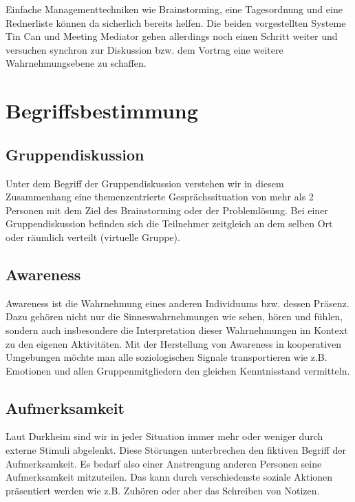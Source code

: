 \documentclass{seminarvorlage}
\begin{document}
Einfache Managementtechniken wie Brainstorming, eine Tagesordnung und eine
Rednerliste können da sicherlich bereits helfen.
Die beiden vorgestellten Systeme Tin Can und Meeting Mediator gehen allerdings
noch einen Schritt weiter und versuchen synchron zur Diskussion bzw. dem Vortrag
eine weitere Wahrnehmungsebene zu schaffen.


\section{Begriffsbestimmung}
\subsection{Gruppendiskussion}
Unter dem Begriff der Gruppendiskussion verstehen wir in diesem Zusammenhang
eine themenzentrierte Ge\-sprächs\-situa\-tion von mehr als 2 Personen mit dem
Ziel des Brainstorming oder der Problemlösung. Bei einer Gruppendiskussion befinden
sich die Teilnehmer zeitgleich an dem selben Ort oder räumlich verteilt
(virtuelle Gruppe).

\subsection{Awareness}
Awareness ist die Wahrnehmung eines anderen Individuums bzw. dessen Präsenz.
Dazu gehören nicht nur die Sinneswahrnehmungen wie sehen, hören und fühlen,
sondern auch insbesondere die Interpretation dieser Wahrnehmungen im Kontext zu
den eigenen Aktivitäten.
Mit der Herstellung von Awareness in kooperativen Umgebungen mö\-chte man alle
soziologischen Signale transportieren wie z.B. Emotionen und allen
Gruppenmitgliedern den gleichen Kenntnisstand vermitteln.

\subsection{Aufmerksamkeit}
Laut Durkheim \cite{Dur1974} sind wir in jeder Situation immer mehr oder weniger
durch externe Stimuli abgelenkt. Diese Stör\-un\-gen unterbrechen den fiktiven
Begriff der Aufmerksamkeit. Es bedarf also einer Anstrengung anderen Personen
seine Aufmerksamkeit mitzuteilen. Das kann durch verschiedenste soziale Aktionen
präsentiert werden wie z.B. Zuhören oder aber das Schreiben von Notizen.
\end{document}

